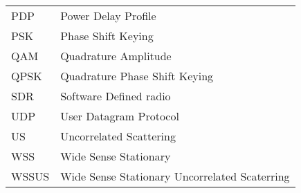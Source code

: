 \documentclass[
	overfullrule,
	paper = a4, twoside, openright, BCOR = 5mm,
	headinclude, footexclude,
	fontsize = 11pt,
	cleardoublepage = empty,
	titlepage, abstract = on,
	automark,
]{scrreprt}
\begin{document}
\begin{tabularx}{\linewidth}{l X}
		PDP    & Power Delay Profile                              \\
		PSK    & Phase Shift Keying                               \\
		QAM    & Quadrature Amplitude                             \\
		QPSK   & Quadrature Phase Shift Keying                    \\
		SDR    & Software Defined radio                           \\
		UDP    & User Datagram Protocol                           \\
		US     & Uncorrelated Scattering                          \\
		WSS    & Wide Sense Stationary                            \\
		WSSUS  & Wide Sense Stationary Uncorrelated Scaterring    \\
		\bottomrule
	\end{tabularx}

	\cleardoublepage

	\hypersetup{pageanchor = true}
	\setcounter{page}{1}
	\pagestyle{scrheadings}

	
	
	
	

	\printskelnotes
	\printbibliography
\end{document}
